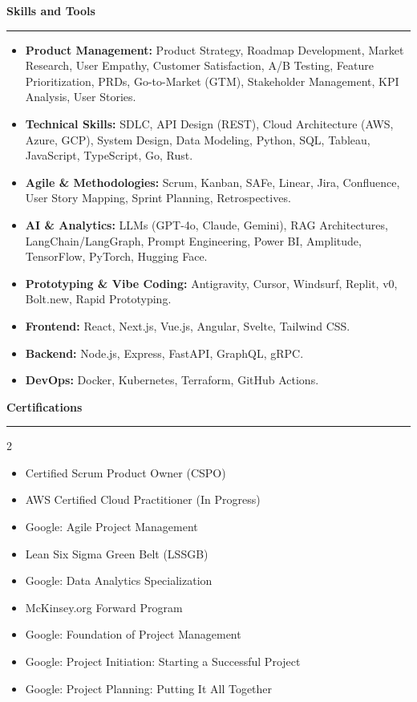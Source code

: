 \documentclass[9pt,letterpaper]{article} %
\newenvironment{rSection}[1]{ %
  \sectionskip
 \textbf{\Large #1} %
  \sectionlineskip
  \hrule %
  \begin{list}{}{ %
    \setlength{\leftmargin}{-0em} %
  }
  \item[]
}{
  \end{list}
}
\def\sectionlineskip{\smallskip} %
\def\sectionskip{} %
\begin{document}
\begin{rSection}{Skills and Tools}
\begin{itemize}[left=-1.5em, labelsep=.1cm, labelwidth=.2cm, itemsep=0.0em, topsep=0pt]
\item \textbf{Product Management:} Product Strategy, Roadmap Development, Market Research, User Empathy, Customer Satisfaction, A/B Testing, Feature Prioritization, PRDs, Go-to-Market (GTM), Stakeholder Management, KPI Analysis, User Stories.
\item \textbf{Technical Skills:} SDLC, API Design (REST), Cloud Architecture (AWS, Azure, GCP), System Design, Data Modeling, Python, SQL, Tableau, JavaScript, TypeScript, Go, Rust.
\item \textbf{Agile \& Methodologies:} Scrum, Kanban, SAFe, Linear, Jira, Confluence, User Story Mapping, Sprint Planning, Retrospectives.
\item \textbf{AI \& Analytics:} LLMs (GPT-4o, Claude, Gemini), RAG Architectures, LangChain/LangGraph, Prompt Engineering, Power BI, Amplitude, TensorFlow, PyTorch, Hugging Face.
\item \textbf{Prototyping \& Vibe Coding:} Antigravity, Cursor, Windsurf, Replit, v0, Bolt.new, Rapid Prototyping.
\item \textbf{Frontend:} React, Next.js, Vue.js, Angular, Svelte, Tailwind CSS.
\item \textbf{Backend:} Node.js, Express, FastAPI, GraphQL, gRPC.
\item \textbf{DevOps:} Docker, Kubernetes, Terraform, GitHub Actions.
\end{itemize}
\end{rSection}%
\begin{rSection}{Certifications}
\begin{multicols}{2}
\begin{itemize}[left=-1.5em, labelsep=.1cm, labelwidth=.2cm, itemsep=0.0em, topsep=0pt]
\item Certified Scrum Product Owner (CSPO)
\item AWS Certified Cloud Practitioner (In Progress)
\item Google: Agile Project Management
\item Lean Six Sigma Green Belt (LSSGB)
\item Google: Data Analytics Specialization
\item McKinsey.org Forward Program
\item Google: Foundation of Project Management
\item Google: Project Initiation: Starting a Successful Project
\item Google: Project Planning: Putting It All Together
\end{itemize}
\end{multicols}
\end{rSection}
\end{document}
